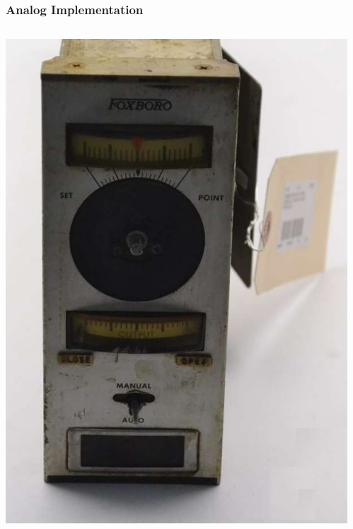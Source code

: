 \begin{frame}
	\frametitle{Analog Implementation}
	\begin{columns}
		\begin{column}{0.3\linewidth}
			\includegraphics[height=0.6\textheight]{img/FB2a}
		\end{column}
		\begin{column}{0.2\linewidth}

\end{column}
\end{columns}
\end{frame}
